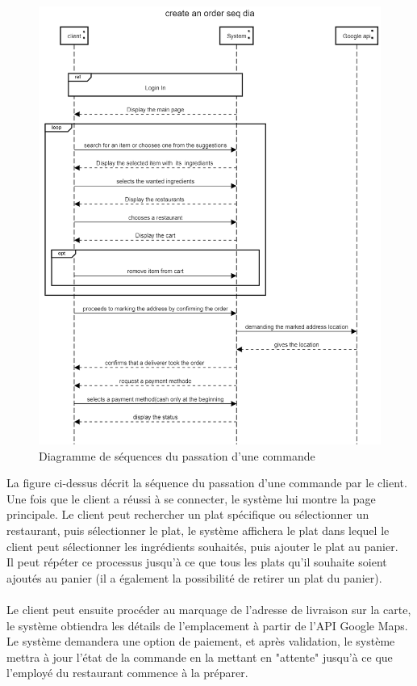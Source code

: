\documentclass[french, a4paper, 12pt]{report}
\begin{document}
			\newpage	
			\begin{figure}[!h]
  				\center
  				\includegraphics[width=15cm]{seqorder.png}
  				\caption{Diagramme de séquences du passation d'une commande}
  				\label{fig:seqorder}
			\end{figure} La figure ci-dessus décrit la séquence du passation d'une commande par le client. Une fois que le client a réussi à se connecter, le système lui montre la page principale. Le client peut rechercher un plat spécifique ou sélectionner un restaurant, puis sélectionner le plat, le système affichera le plat dans lequel le client peut sélectionner les ingrédients souhaités, puis ajouter le plat au panier.\\Il peut répéter ce processus jusqu'à ce que tous les plats qu'il souhaite soient ajoutés au panier (il a également la possibilité de retirer un plat du panier).\\\\
Le client peut ensuite procéder au marquage de l'adresse de livraison sur la carte, le système obtiendra les détails de l'emplacement à partir de l'API Google Maps.\\
Le système demandera une option de paiement, et après validation, le système mettra à jour l'état de la commande en la mettant en "attente" jusqu'à ce que l'employé du restaurant commence à la préparer.
			
\end{document}
